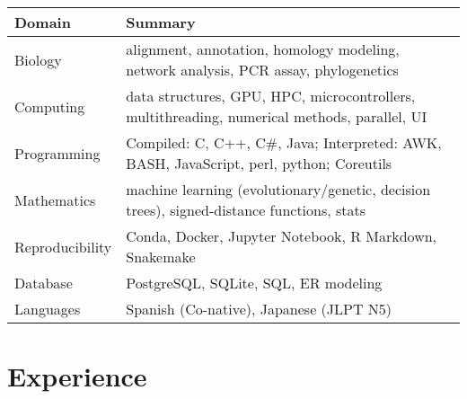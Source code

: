\documentclass[11pt,a4paper,]{awesome-cv}
\begin{document}
\begin{tabular}{l|l}
\hline
\textbf{Domain} & \textbf{Summary}\\
\hline
Biology & alignment, annotation, homology modeling, network analysis, PCR assay, phylogenetics\\
\hline
Computing & data structures, GPU, HPC, microcontrollers, multithreading, numerical methods, parallel, UI\\
\hline
Programming & Compiled: C, C++, C\#, Java; Interpreted: AWK, BASH, JavaScript, perl, python; Coreutils\\
\hline
Mathematics & machine learning (evolutionary/genetic, decision trees), signed-distance functions, stats\\
\hline
Reproducibility & Conda, Docker, Jupyter Notebook, R Markdown, Snakemake\\
\hline
Database & PostgreSQL, SQLite, SQL, ER modeling\\
\hline
Languages & Spanish (Co-native), Japanese (JLPT N5)\\
\hline
\end{tabular}

\hypertarget{experience}{%
\section{Experience}\label{experience}}
\end{document}
